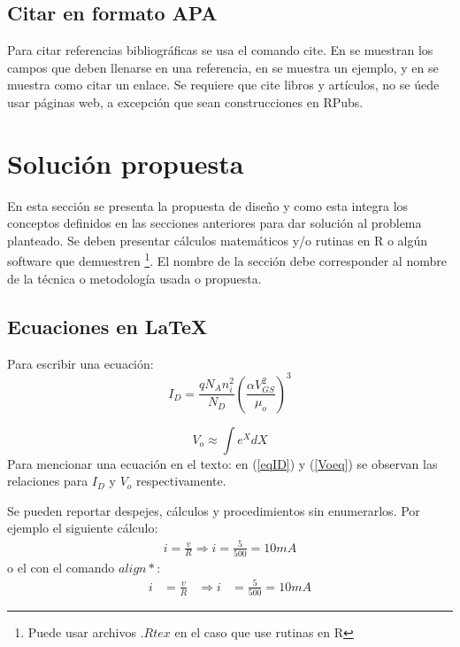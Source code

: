 \documentclass[journal]{IEEEtran}
\begin{document}
\subsection{Citar en formato APA}
Para citar referencias bibliográficas se usa el comando cite. En \cite{nombre_para_citar} se muestran los campos que deben llenarse en una referencia, en \cite{kopka} se muestra un ejemplo, y en \cite{link} se muestra como citar un enlace. Se requiere que cite libros y artículos, no se úede usar páginas web, a excepción que sean construcciones en RPubs.

\section{Solución propuesta}
En esta sección se presenta la propuesta de diseño y como esta integra los conceptos definidos en las secciones anteriores para dar solución al problema planteado. Se deben presentar cálculos matemáticos y/o rutinas en R o algún software  que demuestren \footnote{ Puede usar archivos $.Rtex$ en el caso que use rutinas en R}. El nombre de la sección debe corresponder al nombre de la técnica o metodología usada o propuesta.

\subsection{Ecuaciones en \LaTeX}
Para escribir una ecuación:
\begin{equation}\label{eqID}
I_D=\frac{q N_A n_i^2}{N_D}\left(\frac{\alpha V_{GS}^2}{\mu_o}\right)^3
\end{equation}

\begin{equation}\label{Voeq} %
V_o \approx \int e^XdX
\end{equation}
Para mencionar una ecuación en el texto: en (\ref{eqID}) y (\ref{Voeq}) se observan las relaciones para $I_D$ y $V_o$ respectivamente.

Se pueden reportar despejes, cálculos y procedimientos sin enumerarlos. Por ejemplo el siguiente cálculo:
\begin{gather*}
i=\frac{v}{R}\Longrightarrow i=\frac{5}{500}=10 mA
\end{gather*}
o el con el comando $align*$:
\begin{align*}
    i&=\frac{v}{R}&\Longrightarrow i&=\frac{5}{500}=10 mA
\end{align*}
\end{document}
